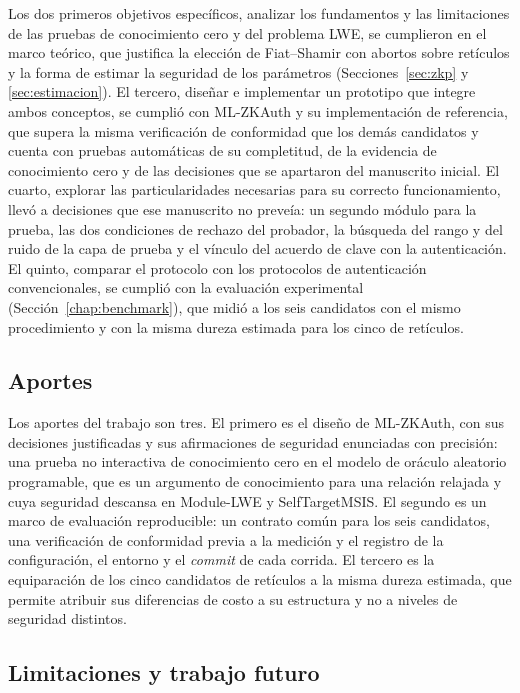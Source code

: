 Los dos primeros objetivos específicos, analizar los fundamentos y las limitaciones de las
pruebas de conocimiento cero y del problema LWE, se cumplieron en el marco teórico, que
justifica la elección de Fiat--Shamir con abortos sobre retículos y la forma de estimar la
seguridad de los parámetros (Secciones~\ref{sec:zkp} y \ref{sec:estimacion}). El tercero,
diseñar e implementar un prototipo que integre ambos conceptos, se cumplió con ML-ZKAuth y
su implementación de referencia, que supera la misma verificación de conformidad que los
demás candidatos y cuenta con pruebas automáticas de su completitud, de la evidencia de
conocimiento cero y de las decisiones que se apartaron del manuscrito inicial. El cuarto,
explorar las particularidades necesarias para su correcto funcionamiento, llevó a
decisiones que ese manuscrito no preveía: un segundo módulo para la prueba, las dos
condiciones de rechazo del probador, la búsqueda del rango y del ruido de la capa de prueba
y el vínculo del acuerdo de clave con la autenticación. El quinto, comparar el protocolo con
los protocolos de autenticación convencionales, se cumplió con la evaluación experimental
(Sección~\ref{chap:benchmark}), que midió a los seis candidatos con el mismo procedimiento y
con la misma dureza estimada para los cinco de retículos.


\subsection{Aportes}

Los aportes del trabajo son tres. El primero es el diseño de ML-ZKAuth, con sus decisiones
justificadas y sus afirmaciones de seguridad enunciadas con precisión: una prueba no
interactiva de conocimiento cero en el modelo de oráculo aleatorio programable, que es un
argumento de conocimiento para una relación relajada y cuya seguridad descansa en Module-LWE
y SelfTargetMSIS. El segundo es un marco de evaluación reproducible: un contrato común para
los seis candidatos, una verificación de conformidad previa a la medición y el registro de
la configuración, el entorno y el \textit{commit} de cada corrida. El tercero es la
equiparación de los cinco candidatos de retículos a la misma dureza estimada, que permite
atribuir sus diferencias de costo a su estructura y no a niveles de seguridad distintos.


\subsection{Limitaciones y trabajo futuro}

